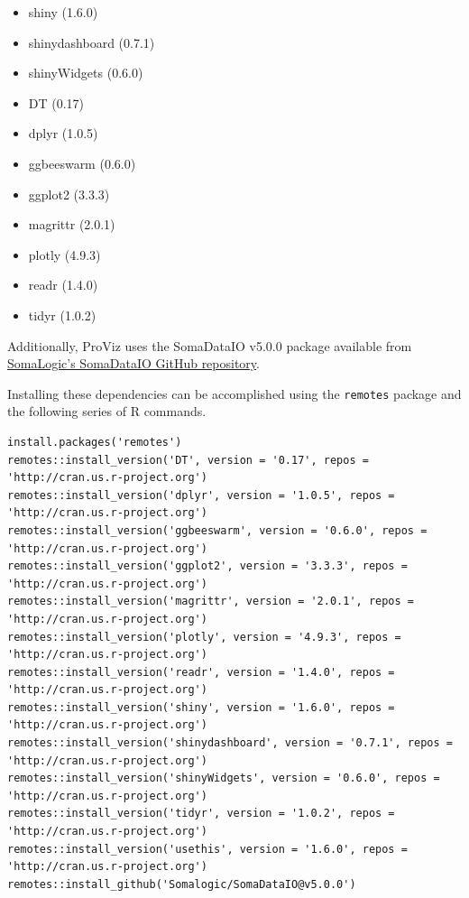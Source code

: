 \documentclass[
]{book}
\providecommand{\tightlist}{%
  \setlength{\itemsep}{0pt}\setlength{\parskip}{0pt}}
\begin{document}
\begin{itemize}
\tightlist
\item
  shiny (1.6.0)
\item
  shinydashboard (0.7.1)
\item
  shinyWidgets (0.6.0)
\item
  DT (0.17)
\item
  dplyr (1.0.5)
\item
  ggbeeswarm (0.6.0)
\item
  ggplot2 (3.3.3)
\item
  magrittr (2.0.1)
\item
  plotly (4.9.3)
\item
  readr (1.4.0)
\item
  tidyr (1.0.2)
\end{itemize}

Additionally, ProViz uses the SomaDataIO v5.0.0 package available from \href{https://github.com/SomaLogic/SomaDataIO}{SomaLogic's SomaDataIO GitHub repository}.

Installing these dependencies can be accomplished using the \texttt{remotes} package and the following series of R commands.

\begin{verbatim}
install.packages('remotes')
remotes::install_version('DT', version = '0.17', repos = 'http://cran.us.r-project.org')
remotes::install_version('dplyr', version = '1.0.5', repos = 'http://cran.us.r-project.org')
remotes::install_version('ggbeeswarm', version = '0.6.0', repos = 'http://cran.us.r-project.org')
remotes::install_version('ggplot2', version = '3.3.3', repos = 'http://cran.us.r-project.org')
remotes::install_version('magrittr', version = '2.0.1', repos = 'http://cran.us.r-project.org')
remotes::install_version('plotly', version = '4.9.3', repos = 'http://cran.us.r-project.org')
remotes::install_version('readr', version = '1.4.0', repos = 'http://cran.us.r-project.org')
remotes::install_version('shiny', version = '1.6.0', repos = 'http://cran.us.r-project.org')
remotes::install_version('shinydashboard', version = '0.7.1', repos = 'http://cran.us.r-project.org')
remotes::install_version('shinyWidgets', version = '0.6.0', repos = 'http://cran.us.r-project.org')
remotes::install_version('tidyr', version = '1.0.2', repos = 'http://cran.us.r-project.org')
remotes::install_version('usethis', version = '1.6.0', repos = 'http://cran.us.r-project.org')
remotes::install_github('Somalogic/SomaDataIO@v5.0.0')
\end{verbatim}
\end{document}
